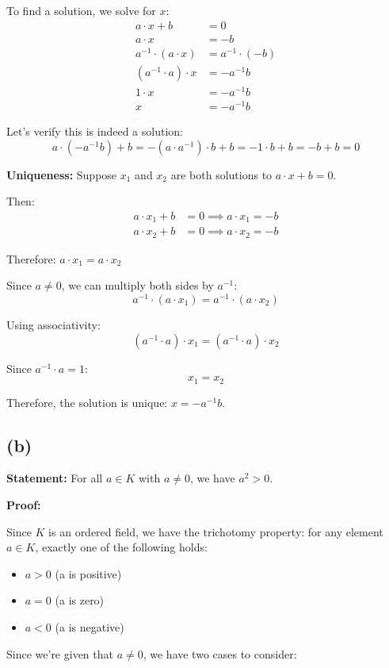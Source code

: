 \documentclass[12pt,a4paper]{article}
\theoremstyle{definition}
\theoremstyle{remark}
\begin{document}
To find a solution, we solve for $x$:
\begin{align}
a \cdot x + b &= 0\\
a \cdot x &= -b\\
a^{-1} \cdot (a \cdot x) &= a^{-1} \cdot (-b)\\
(a^{-1} \cdot a) \cdot x &= -a^{-1}b\\
1 \cdot x &= -a^{-1}b\\
x &= -a^{-1}b
\end{align}

Let's verify this is indeed a solution:
$$a \cdot (-a^{-1}b) + b = -(a \cdot a^{-1}) \cdot b + b = -1 \cdot b + b = -b + b = 0$$

\textbf{Uniqueness:}
Suppose $x_1$ and $x_2$ are both solutions to $a \cdot x + b = 0$.

Then:
\begin{align}
a \cdot x_1 + b &= 0 \implies a \cdot x_1 = -b\\
a \cdot x_2 + b &= 0 \implies a \cdot x_2 = -b
\end{align}

Therefore: $a \cdot x_1 = a \cdot x_2$

Since $a \neq 0$, we can multiply both sides by $a^{-1}$:
$$a^{-1} \cdot (a \cdot x_1) = a^{-1} \cdot (a \cdot x_2)$$

Using associativity:
$$(a^{-1} \cdot a) \cdot x_1 = (a^{-1} \cdot a) \cdot x_2$$

Since $a^{-1} \cdot a = 1$:
$$x_1 = x_2$$

Therefore, the solution is unique: $x = -a^{-1}b$.

\subsection*{(b)}

\textbf{Statement:} For all $a \in K$ with $a \neq 0$, we have $a^2 > 0$.

\textbf{Proof:}

Since $K$ is an ordered field, we have the trichotomy property: for any element $a \in K$, exactly one of the following holds:
\begin{itemize}
\item $a > 0$ (a is positive)
\item $a = 0$ (a is zero)
\item $a < 0$ (a is negative)
\end{itemize}

Since we're given that $a \neq 0$, we have two cases to consider:
\end{document}
